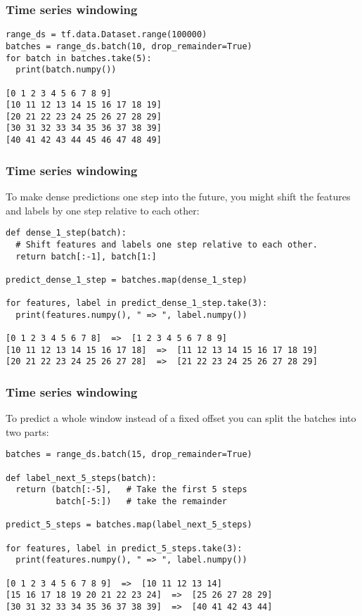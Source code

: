 \begin{frame}[fragile]\frametitle{Time series windowing}
\begin{lstlisting}
range_ds = tf.data.Dataset.range(100000)
batches = range_ds.batch(10, drop_remainder=True)
for batch in batches.take(5):
  print(batch.numpy())
	
[0 1 2 3 4 5 6 7 8 9]
[10 11 12 13 14 15 16 17 18 19]
[20 21 22 23 24 25 26 27 28 29]
[30 31 32 33 34 35 36 37 38 39]
[40 41 42 43 44 45 46 47 48 49]
\end{lstlisting}
\end{frame}

\begin{frame}[fragile]\frametitle{Time series windowing}

To make dense predictions one step into the future, you might shift the features and labels by one step relative to each other:

\begin{lstlisting}
def dense_1_step(batch):
  # Shift features and labels one step relative to each other.
  return batch[:-1], batch[1:]

predict_dense_1_step = batches.map(dense_1_step)

for features, label in predict_dense_1_step.take(3):
  print(features.numpy(), " => ", label.numpy())
	
[0 1 2 3 4 5 6 7 8]  =>  [1 2 3 4 5 6 7 8 9]
[10 11 12 13 14 15 16 17 18]  =>  [11 12 13 14 15 16 17 18 19]
[20 21 22 23 24 25 26 27 28]  =>  [21 22 23 24 25 26 27 28 29]
\end{lstlisting}
\end{frame}

\begin{frame}[fragile]\frametitle{Time series windowing}

To predict a whole window instead of a fixed offset you can split the batches into two parts:


\begin{lstlisting}
batches = range_ds.batch(15, drop_remainder=True)

def label_next_5_steps(batch):
  return (batch[:-5],   # Take the first 5 steps
          batch[-5:])   # take the remainder

predict_5_steps = batches.map(label_next_5_steps)

for features, label in predict_5_steps.take(3):
  print(features.numpy(), " => ", label.numpy())
	
[0 1 2 3 4 5 6 7 8 9]  =>  [10 11 12 13 14]
[15 16 17 18 19 20 21 22 23 24]  =>  [25 26 27 28 29]
[30 31 32 33 34 35 36 37 38 39]  =>  [40 41 42 43 44]
\end{lstlisting}
\end{frame}

